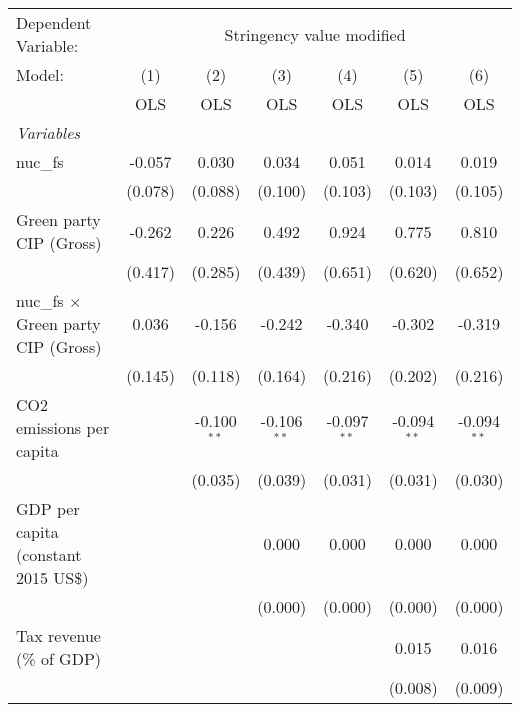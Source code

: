 
\begingroup
\centering
\begin{tabular}{lcccccc}
   \toprule
   Dependent Variable: & \multicolumn{6}{c}{Stringency value modified}\\
   Model:                                     & (1)     & (2)           & (3)           & (4)           & (5)           & (6)\\  
                                              &  OLS    & OLS           & OLS           & OLS           & OLS           & OLS\\  
   \midrule
   \emph{Variables}\\
   nuc\_fs                                    & -0.057  & 0.030         & 0.034         & 0.051         & 0.014         & 0.019\\   
                                              & (0.078) & (0.088)       & (0.100)       & (0.103)       & (0.103)       & (0.105)\\   
   Green party CIP (Gross)                    & -0.262  & 0.226         & 0.492         & 0.924         & 0.775         & 0.810\\   
                                              & (0.417) & (0.285)       & (0.439)       & (0.651)       & (0.620)       & (0.652)\\   
   nuc\_fs $\times$ Green party CIP (Gross)   & 0.036   & -0.156        & -0.242        & -0.340        & -0.302        & -0.319\\   
                                              & (0.145) & (0.118)       & (0.164)       & (0.216)       & (0.202)       & (0.216)\\   
   CO2 emissions per capita                   &         & -0.100$^{**}$ & -0.106$^{**}$ & -0.097$^{**}$ & -0.094$^{**}$ & -0.094$^{**}$\\   
                                              &         & (0.035)       & (0.039)       & (0.031)       & (0.031)       & (0.030)\\   
   GDP per capita (constant 2015 US\$)        &         &               & 0.000         & 0.000         & 0.000         & 0.000\\   
                                              &         &               & (0.000)       & (0.000)       & (0.000)       & (0.000)\\   
   Tax revenue (\% of GDP)                    &         &               &               &               & 0.015         & 0.016\\   
                                              &         &               &               &               & (0.008)       & (0.009)\\   

\end{tabular}
